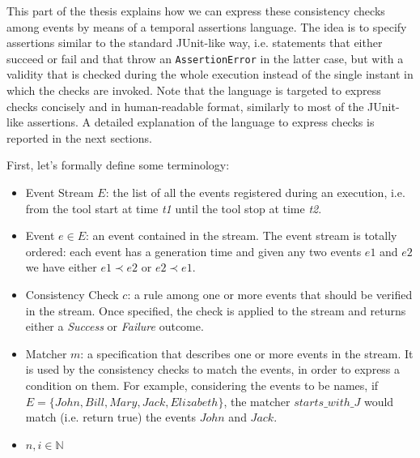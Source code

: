 \documentclass[11pt,a4paper,notitlepage]{article}
\begin{document}
This part of the thesis explains how we can express these consistency checks among events by means of a temporal assertions language. The idea is to specify assertions similar to the standard JUnit-like way, i.e. statements that either succeed or fail and that throw an \texttt{AssertionError} in the latter case, but with a validity that is checked during the whole execution instead of the single instant in which the checks are invoked. Note that the language is targeted to express checks concisely and in human-readable format, similarly to most of the JUnit-like assertions. A detailed explanation of the language to express checks is reported in the next sections.

First, let's formally define some terminology:
\begin{itemize}
	\item Event Stream $E$: the list of all the events registered during an execution, i.e. from the tool start at time \textit{t1} until the tool stop at time \textit{t2}.
	\item Event $e \in E$: an event contained in the stream. The event stream is totally ordered: each event has a generation time and given any two events $e1$ and $e2$ we have either $e1 \prec e2$ or $e2 \prec e1$.
	\item Consistency Check $c$: a rule among one or more events that should be verified in the stream. Once specified, the check is applied to the stream and returns either a \textit{Success} or \textit{Failure} outcome.
	\item Matcher $m$: a specification that describes one or more events in the stream. It is used by the consistency checks to match the events, in order to express a condition on them. For example, considering the events to be names, if $E= \big\{ John, Bill, Mary, Jack, Elizabeth \big\} $, the matcher $starts\_with\_J$ would match (i.e. return true) the events $John$ and $Jack$.
	\item $n, i \in \mathbb{N}$
\end{itemize}
\end{document}
